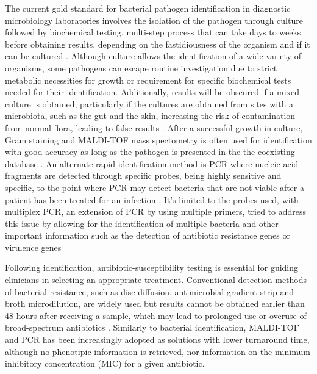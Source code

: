 The current gold standard for bacterial pathogen identification in diagnostic microbiology laboratories involves the isolation of the pathogen through culture followed by biochemical testing, multi-step process that can take days to weeks before obtaining results, depending on the fastidiousness of the organism and if it can be cultured \citep{muhamad_rizal_advantages_2020, giuliano_guide_2019, muhamad_rizal_advantages_2020}. Although culture allows the identification of a wide variety of organisms, some pathogens can escape routine investigation due to strict metabolic necessities for growth or requirement for specific biochemical tests needed for their identification. Additionally, results will be obscured if a mixed culture is obtained, particularly if the cultures are obtained from sites with a microbiota, such as the gut and the skin, increasing the risk of contamination from normal flora, leading to false results \citep{giuliano_guide_2019}. After a successful growth in culture, Gram staining and MALDI-TOF mass spectometry is often used for identification with good accuracy as long as the pathogen is presented in the the coexisting database \citep{patel_maldi-tof_2015}. An alternate rapid identification method is PCR where nucleic acid fragments are detected through specific probes, being highly sensitive and specific, to the point where PCR may detect bacteria that are not viable after a patient has been treated for an infection \citep{scerbo_beyond_2016}. It's limited to the probes used, with multiplex PCR, an extension of PCR by using multiple primers, tried to address this issue by allowing for the identification of multiple bacteria and other important information such as the detection of antibiotic resistance genes or virulence genes \citep{giuliano_guide_2019}

Following identification, antibiotic-susceptibility testing is essential for guiding clinicians in selecting an appropriate treatment. Conventional detection methods of bacterial resistance, such as disc diffusion, antimicrobial gradient strip and broth microdilution, are widely used but results cannot be obtained earlier than 48 hours after receiving a sample, which may lead to prolonged use or overuse of broad-spectrum antibiotics \citep{benkova_antimicrobial_2020}. Similarly to bacterial identification, MALDI-TOF and PCR has been increasingly adopted as solutions with lower turnaround time, although no phenotipic information is retrieved, nor information on the minimum inhibitory concentration (MIC) for a given antibiotic.   

